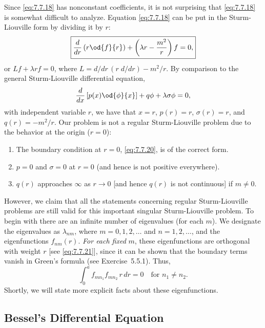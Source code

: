 Since \eqref{eq:7.7.18} has nonconstant coefficients, it is not surprising that \eqref{eq:7.7.18} is somewhat difficult to analyze.  Equation \eqref{eq:7.7.18} can be put in the Sturm-Liouville form by dividing it by $r$:
\begin{equation}
\boxed{\frac{d}{d r}\left(r\od{f}{r}\right) + \left(\lambda r - \frac{m^2}{r}\right)f = 0,}
\label{eq:7.7.21}
\end{equation}
or $Lf + \lambda rf = 0$, where $L = d/dr\,(r\;d/dr) - m^2/r$.  By comparison to the general Sturm-Liouville differential equation,
\[
\frac{d}{d x}\left[p(x)\od{\phi}{x}\right] + q\phi + \lambda\sigma\phi = 0,
\]
with independent variable $r$, we have that $x = r$, $p(r) = r$, $\sigma(r) = r$, and $q(r) = -m^2/r$.  Our problem is not a regular Sturm-Liouville problem due to the behavior at the origin ($r = 0$):

\begin{enumerate}
\item The boundary condition at $r = 0$, \eqref{eq:7.7.20}, is of the correct form.
\item $p = 0$ and $\sigma = 0$ at $r = 0$ (and hence is not positive everywhere).
\item $q(r)$ approaches $\infty$ as $r \to 0$ [and hence $q(r)$ is not continuous] if $m \neq 0$.
\end{enumerate}

However, we claim that all the statements concerning regular Sturm-Liouville problems are still valid for this important singular Sturm-Liouville problem.  To begin with there are an infinite number of eigenvalues (for each $m$).  We designate the eigenvalues as $\lambda_{nm}$, where $m = 0, 1, 2, \ldots$ and $n = 1, 2, \ldots$, and the eigenfunctions $f_{nm}(r)$.  \emph{For each fixed} $m$, these eigenfunctions are orthogonal with weight $r$ [see \eqref{eq:7.7.21}], since it can be shown that the boundary terms vanish in Green's formula (see Exercise~5.5.1).  Thus,
\begin{equation}
\int_0^a f_{mn_1}f_{mn_2}\,r\,dr = 0 \quad\text{for } n_1 \neq n_2.
\label{eq:7.7.22}
\end{equation}
Shortly, we will state more explicit facts about these eigenfunctions.

\subsection{Bessel's Differential Equation}
\label{sec:7.7.4}

